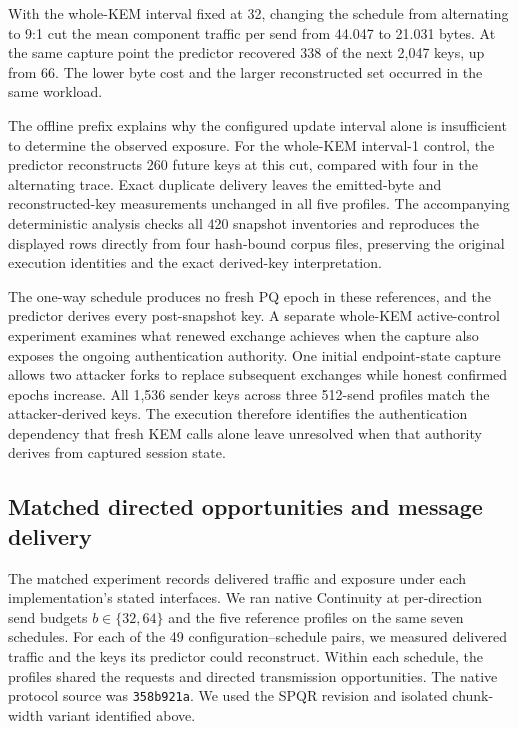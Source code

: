 \documentclass[pdflatex]{sn-jnl}
\theoremstyle{thmstyleone}
\theoremstyle{thmstylethree}
\theoremstyle{thmstyletwo}
\begin{document}
With the whole-KEM interval fixed at 32, changing the schedule from
alternating to 9:1 cut the mean component traffic per send from 44.047
to 21.031 bytes. At the same capture point the predictor recovered 338
of the next 2,047 keys, up from 66. The lower byte cost and the larger
reconstructed set occurred in the same workload.

The offline prefix explains why the configured update interval alone is
insufficient to determine the observed exposure. For the whole-KEM
interval-1 control, the predictor reconstructs 260 future keys at this cut,
compared with four in the alternating trace. Exact duplicate delivery leaves
the emitted-byte and reconstructed-key measurements unchanged in all five
profiles. The accompanying deterministic analysis checks all 420 snapshot
inventories and reproduces the displayed rows directly from four hash-bound
corpus files, preserving the original execution identities and the exact
derived-key interpretation.

The one-way schedule produces no fresh PQ epoch in these references, and
the predictor derives every post-snapshot key. A separate whole-KEM
active-control experiment examines what renewed exchange achieves when
the capture also exposes the ongoing authentication authority. One initial
endpoint-state capture allows two attacker forks to replace subsequent
exchanges while honest confirmed epochs increase. All 1,536 sender keys
across three 512-send profiles match the attacker-derived keys. The
execution therefore identifies the authentication dependency that fresh
KEM calls alone leave unresolved when that authority derives from captured
session state.

\subsection{Matched directed opportunities and message delivery}
\label{sec:matched-opportunities}

The matched experiment records delivered traffic and exposure under each
implementation's stated interfaces. We ran native Continuity at
per-direction send budgets $b\in\{32,64\}$ and the five reference
profiles on the same seven schedules. For each of the 49
configuration--schedule pairs, we measured delivered traffic and the keys
its predictor could reconstruct. Within each schedule, the profiles shared
the requests and directed transmission opportunities. The native protocol
source was \texttt{358b921a}.
We used the SPQR revision and isolated chunk-width variant identified above.
\end{document}
